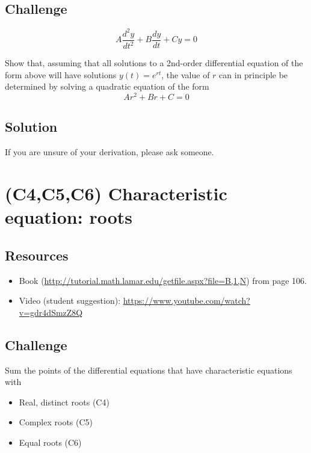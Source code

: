 \subsection*{Challenge}
\begin{equation}
    A \frac{d^2y}{dt^2} + B \frac{dy}{dt} + C y = 0
\end{equation}

Show that, assuming that all solutions to a 2nd-order differential equation of the form above will have solutions $y(t)=e^{rt}$, the value of $r$ can in principle be determined by solving a quadratic equation of the form
\begin{equation}
    A r^2 + Br + C = 0
\end{equation}

\subsection*{Solution}
If you are unsure of your derivation, please ask someone.




\newpage
\section{(C4,C5,C6) Characteristic equation: roots}

\subsection*{Resources}
\begin{itemize}
    \item Book (\url{http://tutorial.math.lamar.edu/getfile.aspx?file=B,1,N}) from page 106.
    \item Video (student suggestion): \url{https://www.youtube.com/watch?v=gdr4dSmzZ8Q}
\end{itemize}

\subsection*{Challenge}
Sum the points of the differential equations that have characteristic equations with
\begin{itemize}
    \item Real, distinct roots (C4)
    \item Complex roots (C5)
    \item Equal roots (C6)
\end{itemize}

